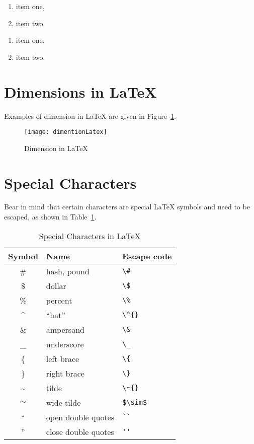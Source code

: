 \begin{enumerate}[nosep,label=(\alph*)]\singlespacing
	\item item one,
	\item item two.
\end{enumerate}

\begin{enumerate}[nosep,label=\Roman*)]\singlespacing
	\item item one,
	\item item two.
\end{enumerate}


\section{Dimensions in \LaTeX{}}
Examples of dimension in \LaTeX{} are given in Figure~\ref{fig:dimentionLatex}.

\begin{figure}[hbt!]\centering
	\texttt{[image: dimentionLatex]}
	\caption{Dimension in \LaTeX{}} \label{fig:dimentionLatex}
\end{figure}

\section{Special Characters}

Bear in mind that certain characters are special \LaTeX{} symbols and need to be escaped, as shown in Table~\ref{tab:special:char}.

\begin{table}[htb!]
\caption{Special Characters in \LaTeX}\label{tab:special:char}
\centering
\begin{singlespace}\begin{tabular}{|c | l | l|}
\hline
Symbol & Name & Escape code \\\hline\hline
\# & \normalsize{hash, pound} & \verb|\#| \\
\$ & \normalsize{dollar} & \verb|\$| \\
\% & \normalsize{percent} & \verb|\%| \\
\^{} & \normalsize{``hat''} & \verb|\^{}| \\
\& & \normalsize{ampersand} & \verb|\&| \\
\_ & \normalsize{underscore} & \verb|\_| \\
\{ & \normalsize{left brace} & \verb|\{| \\
\} & \normalsize{right brace} & \verb|\}| \\
\~{} & \normalsize{tilde} & \verb|\~{}| \\
$\sim$ & \normalsize{wide tilde} & \verb|$\sim$| \\
`` & \normalsize{open double quotes} & \verb|``| \\
'' & \normalsize{close double quotes} & \verb|''| \\
\hline
\end{tabular}\end{singlespace}
\end{table}

